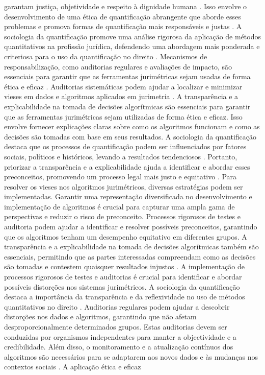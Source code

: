garantam justiça, objetividade e respeito à dignidade humana \cite{10.1590/dados.2022.65.3.267,salais2016quantification}. Isso envolve o desenvolvimento de uma ética de quantificação abrangente que aborde esses problemas e promova formas de quantificação mais responsáveis e justas \cite{10.1057/s41599-020-0396-5,10.1057/s41599-020-00557-0}. A sociologia da quantificação promove uma análise rigorosa da aplicação de métodos quantitativos na profissão jurídica, defendendo uma abordagem mais ponderada e criteriosa para o uso da quantificação no direito \cite{10.1007/s11186-021-09453-1,salais2016quantification}. Mecanismos de responsabilização, como auditorias regulares e avaliações de impacto, são essenciais para garantir que as ferramentas jurimétricas sejam usadas de forma ética e eficaz \cite{10.1007/s11186-021-09453-1,1023071190721}. Auditorias sistemáticas podem ajudar a localizar e minimizar vieses em dados e algoritmos aplicados em jurimetria \cite{10.1590/dados.2022.65.3.267,inthelawviewmetadatacitationsimilarpapers2014}. A transparência e a explicabilidade na tomada de decisões algorítmicas são essenciais para garantir que as ferramentas jurimétricas sejam utilizadas de forma ética e eficaz. Isso envolve fornecer explicações claras sobre como os algoritmos funcionam e como as decisões são tomadas com base em seus resultados. A sociologia da quantificação destaca que os processos de quantificação podem ser influenciados por fatores sociais, políticos e históricos, levando a resultados tendenciosos \cite{10.1007/s11186-021-09453-1,1023071190721}. Portanto, priorizar a transparência e a explicabilidade ajuda a identificar e abordar esses preconceitos, promovendo um processo legal mais justo e equitativo \cite{10.1007/s11186-021-09453-1,1023071190721}. Para resolver os vieses nos algoritmos jurimétricos, diversas estratégias podem ser implementadas. Garantir uma representação diversificada no desenvolvimento e implementação de algoritmos é crucial para capturar uma ampla gama de perspectivas e reduzir o risco de preconceito. Processos rigorosos de testes e auditoria podem ajudar a identificar e resolver possíveis preconceitos, garantindo que os algoritmos tenham um desempenho equitativo em diferentes grupos. A transparência e a explicabilidade na tomada de decisões algorítmicas também são essenciais, permitindo que as partes interessadas compreendam como as decisões são tomadas e contestem quaisquer resultados injustos \cite{unger2021process}. A implementação de processos rigorosos de testes e auditorias é crucial para identificar e abordar possíveis distorções nos sistemas jurimétricos. A sociologia da quantificação destaca a importância da transparência e da reflexividade no uso de métodos quantitativos no direito \cite{10.1007/s11186-021-09453-1,10.1057/s41599-020-0396-5}. Auditorias regulares podem ajudar a descobrir distorções nos dados e algoritmos, garantindo que não afetam desproporcionalmente determinados grupos. Estas auditorias devem ser conduzidas por organismos independentes para manter a objectividade e a credibilidade. Além disso, o monitoramento e a atualização contínuos dos algoritmos são necessários para se adaptarem aos novos dados e às mudanças nos contextos sociais \cite{10.1007/s11186-021-09453-1,10.1057/s41599-020-0396-5}. A aplicação ética e eficaz 